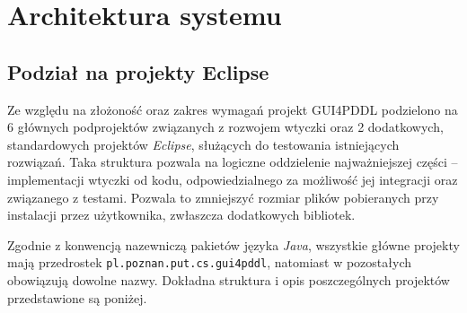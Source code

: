 \chapter{Architektura systemu}
\section{Podział na projekty Eclipse}
Ze względu na złożoność oraz zakres wymagań projekt GUI4PDDL podzielono na 6 głównych podprojektów związanych z rozwojem wtyczki oraz 2 dodatkowych, standardowych projektów \textit{Eclipse}, służących do testowania istniejących rozwiązań. Taka struktura pozwala na logiczne oddzielenie najważniejszej części -- implementacji wtyczki od kodu, odpowiedzialnego za możliwość jej integracji oraz związanego z testami. Pozwala to zmniejszyć rozmiar plików pobieranych przy instalacji przez użytkownika, zwłaszcza dodatkowych bibliotek.

Zgodnie z konwencją nazewniczą pakietów języka \textit{Java}, wszystkie główne projekty mają przedrostek \texttt{pl.poznan.put.cs.gui4pddl}, natomiast w pozostałych obowiązują dowolne nazwy. Dokładna struktura i opis poszczególnych projektów przedstawione są poniżej.

